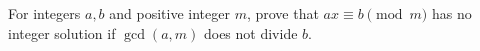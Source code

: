 For integers $a,b$ and positive integer $m$, prove that $ax\equiv b\pmod m$ has no integer solution if $\gcd(a,m)$ does not divide $b$.
